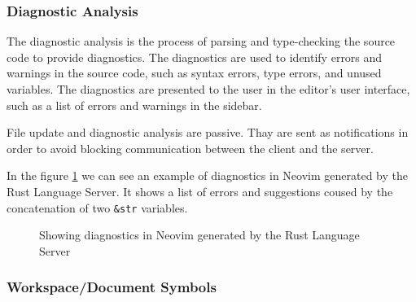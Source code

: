 \subsubsection{Diagnostic Analysis}\label{subsubsec:DiagnosticAnalysis}

The diagnostic analysis is the process of parsing and type-checking the source code to provide diagnostics. The diagnostics are used to identify errors and warnings in the source code, such as syntax errors, type errors, and unused variables. The diagnostics are presented to the user in the editor's user interface, such as a list of errors and warnings in the sidebar.

File update and diagnostic analysis are passive. Thay are sent as notifications in order to avoid blocking communication between the client and the server.

In the figure \ref{fig:diagnostic} we can see an example of diagnostics in Neovim generated by the Rust Language Server. It shows a list of errors and suggestions coused by the concatenation of two \texttt{\&str} variables.

\begin{figure}[t]
    \centering
    \caption{Showing diagnostics in Neovim generated by the Rust Language Server}
    \label{fig:diagnostic}
\end{figure}

\subsubsection{Workspace/Document Symbols}\label{subsubsec:WorkspaceDocumentSymbols}

\hfill \break

